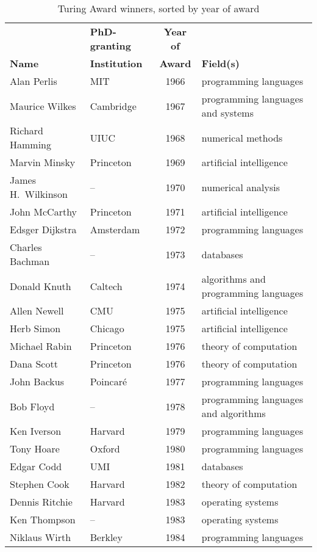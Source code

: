 \documentclass[doublespacing]{utdthesis}
\begin{document}
\begin{table}[p]
  \caption{Turing Award winners, sorted by year of award}
  \label{t:splittable}
  \begin{center}
  \begin{tabular}{llcp{2.5in}} \hline
  & \textbf{PhD-granting} & \textbf{Year of} & \\
  \textbf{Name} & \textbf{Institution} & \textbf{Award} & \textbf{Field(s)} \\ \hline
  Alan Perlis & MIT & 1966 & programming languages \\
  Maurice Wilkes & Cambridge & 1967 & programming languages and systems \\
  Richard Hamming & UIUC & 1968 & numerical methods \\
  Marvin Minsky & Princeton & 1969 & artificial intelligence \\
  James H.~Wilkinson & -- & 1970 & numerical analysis \\
  John McCarthy & Princeton & 1971 & artificial intelligence \\
  Edsger Dijkstra & Amsterdam & 1972 & programming languages \\
  Charles Bachman & -- & 1973 & databases \\
  Donald Knuth & Caltech & 1974 & algorithms and programming languages \\
  Allen Newell & CMU & 1975 & artificial intelligence \\
  Herb Simon & Chicago & 1975 & artificial intelligence \\
  Michael Rabin & Princeton & 1976 & theory of computation \\
  Dana Scott & Princeton & 1976 & theory of computation \\
  John Backus & Poincar\'e & 1977 & programming languages \\
  Bob Floyd & -- & 1978 & programming languages and algorithms \\
  Ken Iverson & Harvard & 1979 & programming languages \\
  Tony Hoare & Oxford & 1980 & programming languages \\
  Edgar Codd & UMI & 1981 & databases \\
  Stephen Cook & Harvard & 1982 & theory of computation \\
  Dennis Ritchie & Harvard & 1983 & operating systems \\
  Ken Thompson & -- & 1983 & operating systems \\
  Niklaus Wirth & Berkley & 1984 & programming languages \\

\end{tabular}
\end{center}
\end{table}
\end{document}
